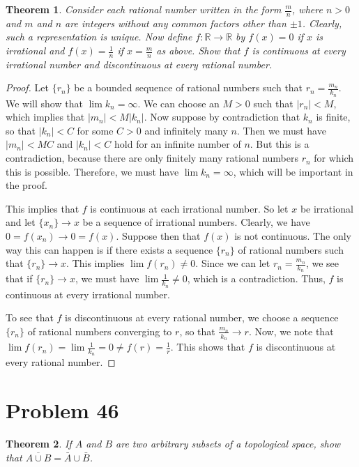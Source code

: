 \documentclass[psamsfonts]{amsart}
\newtheorem{thm}{Theorem}[section]
\theoremstyle{definition}
\theoremstyle{remark}
\numberwithin{equation}{section}
\begin{document}
\begin{thm}
Consider each rational number written in the form $\frac{m}{n}$, where $n > 0$ and $m$ and $n$ are integers without any common factors other than $\pm 1$. Clearly, such a representation is unique. Now define $f: \mathbb{R} \to \mathbb{R}$ by $f(x) = 0$ if $x$ is irrational and $f(x) = \frac{1}{n}$ if $x = \frac{m}{n}$ as above. Show that $f$ is continuous at every irrational number and discontinuous at every rational number.
\end{thm}

\begin{proof}
Let $\{ r_n \}$ be a bounded sequence of rational numbers such that $r_n = \frac{m_n}{k_n}$. We will show that $\lim k_n = \infty$. We can choose an $M>0$ such that $|r_n | < M$, which implies that $|m_n| < M |k_n|$. Now suppose by contradiction that $k_n$ is finite, so that $|k_n| < C$ for some $C>0$ and infinitely many $n$. Then we must have $|m_n| < MC$ and $|k_n | < C$ hold for an infinite number of $n$. But this is a contradiction, because there are only finitely many rational numbers $r_n$ for which this is possible. Therefore, we must have $\lim k_n = \infty$, which will be important in the proof.

This implies that $f$ is continuous at each irrational number. So let $x$ be irrational and let $\{x_n\} \to x$ be a sequence of irrational numbers. Clearly, we have $0 = f(x_n ) \to 0 = f(x)$. Suppose then that $f(x)$ is not continuous. The only way this can happen is if there exists a sequence $\{ r_n \}$ of rational numbers such that $\{ r_n \} \to x$. This implies $\lim f(r_n) \neq 0$.  Since we can let $r_n = \frac{m_n}{k_n}$, we see that if $\{ r_n \} \to x$, we must have $\lim \frac{1}{k_n} \neq 0$, which is a contradiction. Thus, $f$ is continuous at every irrational number.

To see that $f$ is discontinuous at every rational number, we choose a sequence $\{ r_n \}$ of rational numbers converging to $r$, so that $\frac{m_n}{k_n} \to r$. Now, we note that $\lim f(r_n) = \lim \frac{1}{k_n} = 0 \neq f(r) = \frac{1}{r}$. This shows that $f$ is discontinuous at every rational number.    
\end{proof}

\section{Problem 46}

\begin{thm}
If $A$ and $B$ are two arbitrary subsets of a topological space, show that $\overline{A \cup B} = \bar{A} \cup \bar{B}$.
\end{thm}
\end{document}
